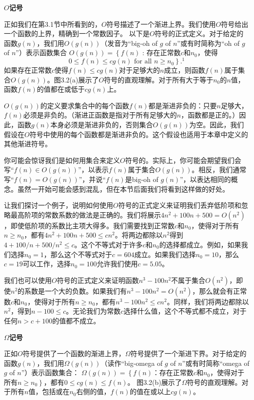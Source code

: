 \documentclass[lang=cn,newtx,10pt,scheme=chinese]{elegantbook}
\begin{document}
\textbf{$O$记号}

正如我们在第3.1节中所看到的，$O$符号描述了一个渐进上界。我们使用$O$符号给出一个函数的上界，精确到一个常数因子。
以下是$O$符号的正式定义。对于给定的函数$g(n)$，我们用$O(g(n))$（发音为“big-oh of $g$ of $n$”或有时简称为“oh of $g$ of $n$”）表示函数集合
$O(g(n))=\left\{f(n)\right.$ : 存在正常数$c$和$n_0$，使得
$$
\left.0 \leq f(n) \leq c g(n) \text { for all } n \geq n_0\right\} .{ }^1
$$
如果存在正常数$c$使得$f(n) \leq c g(n)$对于足够大的$n$成立，则函数$f(n)$属于集合$O(g(n))$。图3.2(a)展示了$O$符号的直观理解。对于所有大于等于$n_0$的$n$值，函数$f(n)$的值都在或低于$cg(n)$上。

$O(g(n))$的定义要求集合中的每个函数$f(n)$都是渐进非负的：只要$n$足够大，$f(n)$必须是非负的。（渐进正函数是指对于所有足够大的$n$，函数都是正的。）因此，函数$g(n)$本身必须是渐进非负的，否则集合$O(g(n))$为空。因此，我们假设在$O$符号中使用的每个函数都是渐进非负的。这个假设也适用于本章中定义的其他渐进符号。

你可能会惊讶我们是如何用集合来定义$O$符号的。实际上，你可能会期望我们会写“$f(n) \in O(g(n))$”，以表示$f(n)$属于集合$O(g(n))$。相反，我们通常写“$f(n)=O(g(n))$”，并说“$f(n)$是big-oh of $g(n)$”，以表达相同的概念。虽然一开始可能会感到混乱，但在本节后面我们将看到这样做的好处。

让我们探讨一个例子，说明如何使用$O$符号的正式定义来证明我们丢弃低阶项和忽略最高阶项的常数系数的做法是正确的。我们将展示$4 n^2+100 n+500=O\left(n^2\right)$，即使低阶项的系数比主项大得多。我们需要找到正常数$c$和$n_0$，使得对于所有$n \geq n_0$，都有$4 n^2+100 n+500 \leq c n^2$。将两边都除以$n^2$得到$4+100 / n+500 / n^2 \leq c$。这个不等式对于许多$c$和$n_0$的选择都成立。例如，如果我们选择$n_0=1$，那么这个不等式对于$c=604$成立。如果我们选择$n_0=10$，那么$c=19$可以工作，选择$n_0=100$允许我们使用$c=5.05$。

我们也可以使用$O$符号的正式定义来证明函数$n^3-100 n^2$不属于集合$O\left(n^2\right)$，即使$n^2$的系数是一个大的负数。如果我们有$n^3-100 n^2=O\left(n^2\right)$，那么就会有正常数$c$和$n_0$，使得对于所有$n \geq n_0$，都有$n^3-100 n^2 \leq c n^2$。同样，我们将两边都除以$n^2$，得到$n-100 \leq c$。无论我们为常数$c$选择什么值，这个不等式都不成立，对于任何$n>c+100$的值都不成立。

\textbf{$\Omega$记号}

正如$O$符号提供了一个函数的渐进上界，$\Omega$符号提供了一个渐进下界。对于给定的函数$g(n)$，我们用$\Omega(g(n))$（读作“big-omega of $g$ of $n$”或有时简称“omega of $g$ of $n$”）表示函数集合：
$\Omega(g(n))=\left\{f(n)\right.$：存在正常数$c$和$n_0$，使得对于所有$\left.n \geq n_0\right\}$，都有$0 \leq c g(n) \leq f(n)$。
图3.2(b)展示了$\Omega$符号的直观理解。对于所有$n$值，包括或在$n_0$右侧的值，$f(n)$的值在或以上$c g(n)$。
\end{document}
